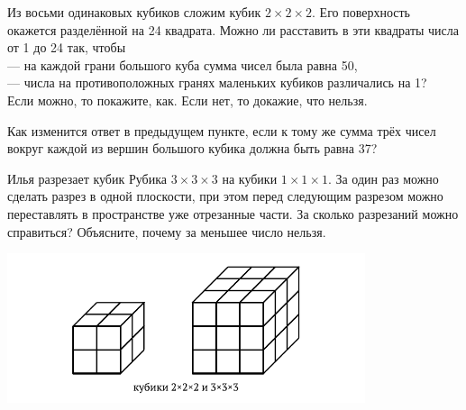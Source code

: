 ﻿
\begin{itemize}

\itA Из восьми одинаковых кубиков сложим кубик $2 \times 2 \times 2$. Его поверхность окажется разделённой на 24 квадрата. Можно ли расставить в эти квадраты числа от 1 до 24 так, чтобы \\
— на каждой грани большого куба сумма чисел была равна 50, \\
— числа на противоположных гранях маленьких кубиков различались на 1?\\
Если можно, то покажите, как. Если нет, то докажие, что нельзя.

\itB Как изменится ответ в предыдущем пункте, если к тому же сумма трёх чисел вокруг каждой из вершин большого кубика должна быть равна 37?

\itC Илья разрезает кубик Рубика $3\times 3\times 3$ на кубики $1\times 1\times 1$. За один раз можно сделать разрез в одной плоскости, при этом перед следующим разрезом можно переставлять в пространстве уже отрезанные части. За сколько разрезаний можно справиться? Объясните, почему за меньшее число нельзя.
\end{itemize}

\vspace{-0.3cm}
\begin{center}
\includegraphics[width=10.5cm]{stats/2017/images/cubes.pdf}
\end{center} \vspace{-0.7cm}
